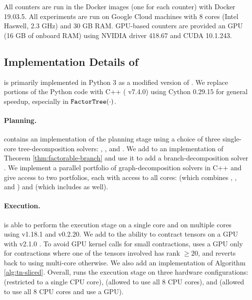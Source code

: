 All counters are run in the Docker images (one for each counter) with Docker 19.03.5. All experiments are run on Google Cloud  machines with 8 cores (Intel Haswell, 2.3 GHz) and 30 GB RAM. GPU-based counters are provided an  GPU (16 GB of onboard RAM) using NVIDIA driver 418.67 and CUDA 10.1.243.

\subsection{Implementation Details of }
\label{sec:experiments:impl}
 is primarily implemented in Python 3 as a modified version of . We replace portions of the Python code with C++ ( v7.4.0) using Cython 0.29.15 for general speedup, especially in $\texttt{\upshape FactorTree}(\cdot)$.

\paragraph{Planning.} 
 contains an implementation of the planning stage using a choice of three single-core tree-decomposition solvers:  \cite{Tamaki17},  \cite{HS18}, and  \cite{AMW17}. We add to  an implementation of Theorem \ref{thm:factorable-branch} and use it to add a branch-decomposition solver  \cite{hicks02}.
We implement a parallel portfolio of graph-decomposition solvers in C++ and give  access to two portfolios, each with access to all cores:  (which combines ,  , and ) and  (which includes  as well).

\paragraph{Execution.} 
 is able to perform the execution stage on a single core and on multiple cores using  v1.18.1 and  v0.2.20. We add to  the ability to contract tensors on a GPU with  v2.1.0 \cite{ABCCDDDGII16}. To avoid GPU kernel calls for small contractions,  uses a GPU only for contractions where one of the tensors involved has rank $\geq 20$, and reverts back to using multi-core  otherwise. We also add an implementation of Algorithm \ref{alg:tn-sliced}.
Overall,  runs the execution stage on three hardware configurations:  (restricted to a single CPU core),  (allowed to use all 8 CPU cores), and  (allowed to use all 8 CPU cores and use a GPU).

